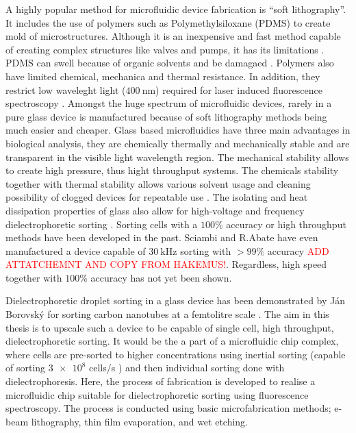 \documentclass[draft]{jyflluk}
\begin{document}
A highly popular method for microfluidic device fabrication is “soft lithography”. It includes the use of polymers such as Polymethylsiloxane (PDMS) to create mold of microstructures. Although it is an inexpensive and fast method capable of creating complex structures like valves and pumps, it has its limitations \cite{xia_soft_1998,tian2008introduction, pethig_review_2010, grover_monolithic_2003}. PDMS can swell because of organic solvents and be damagaed \cite{lee_solvent_2003}. Polymers also have limited chemical, mechanica and thermal resistance. In addition, they restrict low waveleght light ($\SI{400}{\nano \metre}$) required for laser induced fluorescence spectroscopy \cite{tian2008introduction,stankova_optical_2016}. Amongst the huge spectrum of microfluidic devices, rarely in a pure glass device is manufactured because of soft lithography methods being much easier and cheaper. Glass based microfluidics have three main advantages in biological analysis, they are chemically thermally and mechanically stable and are transparent in the visible light wavelength region. The mechanical stability allows to create high pressure, thus hight throughput systems. The chemicals stability together with thermal stability allows various solvent usage and cleaning possibility of clogged devices for repeatable use \cite{ofner_high-throughput_2017}. The isolating and heat dissipation properties of glass also allow for high-voltage and frequency dielectrophoretic sorting \cite{effenhauser_high-speed_1994}.
Sorting cells with a $100 \percent$ accuracy \cite{takahashi_non-destructive_2004, thomas_imagebased_2019} or high throughput methods \cite{zhang_towards_2015} have been developed in the past. Sciambi and R.Abate have even manufactured a device capable of $\SI{30}{\kilo \Hz}$ sorting with $>99 \percent$ accuracy \textcolor{red}{ADD ATTATCHEMNT AND COPY FROM HAKEMUS!}. Regardless, high speed together with $100\percent$ accuracy has not yet been shown.

Dielectrophoretic droplet sorting in a glass device has been demonstrated by Ján Borovský for sorting carbon nanotubes at a femtolitre scale \cite{borovsky}. The aim in this thesis is to upscale such a device to be capable of single cell, high throughput, dielectrophoretic sorting. It would be the a part of a microfluidic chip complex, where cells are pre-sorted to higher concentrations using inertial sorting (capable of sorting $\num{3e8}$ cells/s \cite{edd_microfluidic_2020}) and then individual sorting done with dielectrophoresis. Here, the process of fabrication is developed to realise a microfluidic chip suitable for dielectrophoretic sorting using fluorescence spectroscopy. The process is conducted using basic microfabrication methods; e-beam lithography, thin film evaporation, and wet etching.
\end{document}
